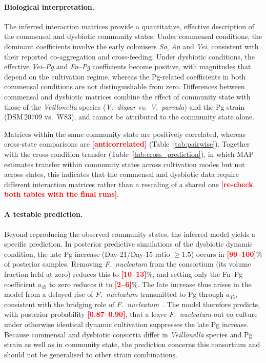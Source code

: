 \documentclass[pdflatex,sn-mathphys-ay,lineno]{sn-jnl}%
\newcommand{\TBD}[1]{\textcolor{red}{\textbf{[#1]}}}
\begin{document}
\paragraph{Biological interpretation.}
The inferred interaction matrices provide a quantitative, effective description of the commensal and dysbiotic community states.
Under commensal conditions, the dominant coefficients involve the early colonisers \textit{So}, \textit{An} and \textit{Vei}, consistent with their reported co-aggregation and cross-feeding. Under dysbiotic conditions, the effective \textit{Vei}--\textit{Pg} and \textit{Fn}--\textit{Pg} coefficients become positive, with magnitudes that depend on the cultivation regime, whereas the Pg-related coefficients in both commensal conditions are not distinguishable from zero.
Differences between commensal and dysbiotic matrices combine the effect of community state with those of the \textit{Veillonella} species (\textit{V.~dispar} vs.\ \textit{V.~parvula}) and the Pg strain (DSM\,20709 vs.\ W83), and cannot be attributed to the community state alone.

Matrices within the same community state are positively correlated, whereas cross-state comparisons are \TBD{anticorrelated} (Table~\ref{tab:pairwise}).
Together with the cross-condition transfer (Table~\ref{tab:cross_prediction}), in which MAP estimates transfer within community states across cultivation modes but not across states, this indicates that the commensal and dysbiotic data require different interaction matrices rather than a rescaling of a shared one \TBD{re-check both tables with the final runs}.

\paragraph{A testable prediction.}
Beyond reproducing the observed community states, the inferred model yields a specific prediction.
In posterior predictive simulations of the dysbiotic dynamic condition, the late Pg increase (Day-21/Day-15 ratio $\ge1.5$) occurs in \TBD{99--100}\% of posterior samples.
Removing \textit{F.~nucleatum} from the consortium (its volume fraction held at zero) reduces this to \TBD{10--13}\%, and setting only the Fn--Pg coefficient $a_{45}$ to zero reduces it to \TBD{2--6}\%.
The late increase thus arises in the model from a delayed rise of \textit{F.~nucleatum} transmitted to Pg through $a_{45}$, consistent with the bridging role of \textit{F.~nucleatum}~\citep{Kolenbrander2010OralMultispecies}.
The model therefore predicts, with posterior probability \TBD{0.87--0.90}, that a leave-\textit{F.~nucleatum}-out co-culture under otherwise identical dynamic cultivation suppresses the late Pg increase.
Because commensal and dysbiotic consortia differ in \textit{Veillonella} species and Pg strain as well as in community state, the prediction concerns this consortium and should not be generalised to other strain combinations.
\end{document}
